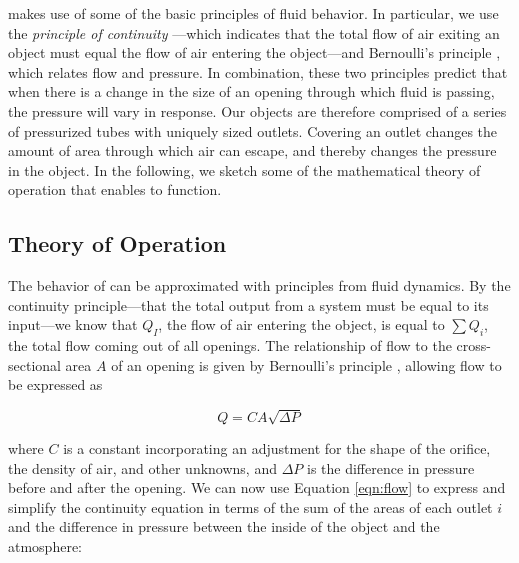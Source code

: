 			\at makes use of some of the basic principles of fluid behavior. In
			particular, we use the \textit{principle of continuity}
			\cite{Rieutord:2015iw}---which indicates that the total flow of air exiting
			an object must equal the flow of air entering the object---and Bernoulli's
			principle \cite{bernoulli1738hydrodynamica}, which relates flow and
			pressure. In combination, these two principles predict that when there is a
			change in the size of an opening through which fluid is passing, the
			pressure will vary in response. Our objects are therefore comprised of a
			series of pressurized tubes with uniquely sized outlets. Covering an outlet
			changes the amount of area through which air can escape, and thereby changes
			the pressure in the object. In the following, we sketch some of the
			mathematical theory of operation that enables \at to function.

			\subsection{Theory of Operation}
				The behavior of \at can be approximated with principles from fluid
				dynamics. By the continuity principle---that the total output from a
				system must be equal to its input---we know that $Q_I$, the flow of air
				entering the object, is equal to $\sum Q_i$, the total flow coming out of
				all openings. The relationship of flow to the cross-sectional area $A$ of
				an opening is given by Bernoulli's principle \cite{Rieutord:2015iw},
				allowing flow to be expressed as

				\begin{equation}
					Q = CA\sqrt{\Delta P}
					\label{eqn:flow}
				\end{equation}

				where $C$ is a constant incorporating an adjustment for the shape of the
				orifice, the density of air, and other unknowns, and $\Delta P$ is the
				difference in pressure before and after the opening. We can now use
				Equation \ref{eqn:flow} to express and simplify the continuity equation in terms
				of the sum of the areas of each outlet $i$ and the difference in pressure
				between the inside of the object and the atmosphere:


